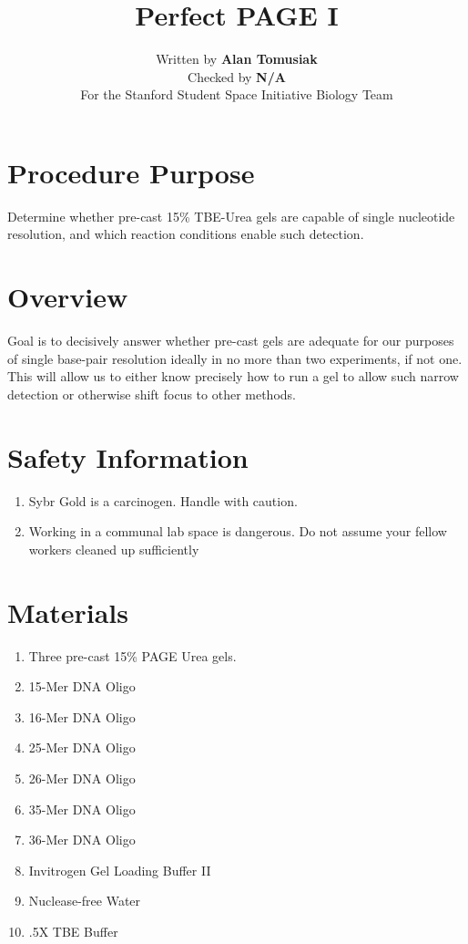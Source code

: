 \documentclass[letterpaper]{article}
\title{Perfect PAGE I} %
\author{Written by \textbf{Alan Tomusiak}\\ %
		Checked by \textbf{N/A}\\ %
        For the Stanford Student Space Initiative Biology Team}
\newenvironment{safety}{%
\begin{tcolorbox}[width=\textwidth, colframe=safetyFrame, arc=1.5mm]
}%
{\end{tcolorbox}}
\begin{document}
\maketitle

\section{Procedure Purpose} %
Determine whether pre-cast 15\% TBE-Urea gels are capable of single nucleotide resolution, and which reaction conditions enable such detection.

\section{Overview} %
Goal is to decisively answer whether pre-cast gels are adequate for our purposes of single base-pair resolution ideally in no more than two experiments, if not one. This will allow us to either know precisely how to run a gel to allow such narrow detection or otherwise shift focus to other methods.
\\
\section{Safety Information}
\begin{safety}
\begin{enumerate}
\item{Sybr Gold is a carcinogen. Handle with caution.}
\item{Working in a communal lab space is dangerous. Do not assume your fellow workers cleaned up sufficiently}
\end{enumerate}
\end{safety}

\section{Materials}
\begin{enumerate}
\item{Three pre-cast 15\% PAGE Urea gels.}
\item{15-Mer DNA Oligo}
\item{16-Mer DNA Oligo}
\item{25-Mer DNA Oligo}
\item{26-Mer DNA Oligo}
\item{35-Mer DNA Oligo}
\item{36-Mer DNA Oligo}
\item{Invitrogen Gel Loading Buffer II}
\item{Nuclease-free Water}
\item{.5X TBE Buffer}
\end{enumerate}
\end{document}
